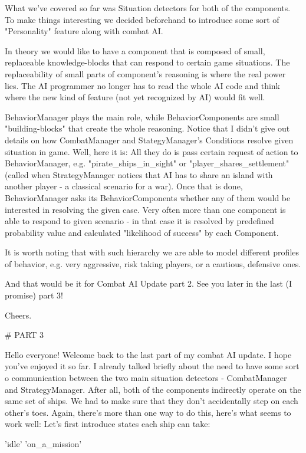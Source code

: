 What we've covered so far was Situation detectors for both of the components. 
To make things interesting we decided beforehand to introduce some sort of "Personality" feature along with combat AI.

In theory we would like to have a component that is composed of small, replaceable knowledge-blocks that can respond to certain game situations. 
The replaceability of small parts of component's reasoning is where the real power lies. 
The AI programmer no longer has to read the whole AI code and think where the new kind of feature (not yet recognized by AI) would fit well.

BehaviorManager plays the main role, while BehaviorComponents are small "building-blocks" that create the whole reasoning. 
Notice that I didn't give out details on how CombatManager and StategyManager's Conditions resolve given situation in game. 
Well, here it is: All they do is pass certain request of action to BehaviorManager, e.g. "pirate_ships_in_sight" or "player_shares_settlement" (called when StrategyManager notices that AI has to share an island with another player - a classical scenario for a war). 
Once that is done, BehaviorManager asks its BehaviorComponents whether any of them would be interested in resolving the given case. 
Very often more than one component is able to respond to given scenario - in that case it is resolved by predefined probability value and calculated "likelihood of success" by each Component.

It is worth noting that with such hierarchy we are able to model different profiles of behavior, e.g. very aggressive, risk taking players, or a cautious, defensive ones.

And that would be it for Combat AI Update part 2. 
See you later in the last (I promise) part 3!

Cheers.

# PART 3 

Hello everyone!
Welcome back to the last part of my combat AI update. I hope you've enjoyed it so far.
I already talked briefly about the need to have some sort o communication between the two main situation detectors - CombatManager and StrategyManager. 
After all, both of the components indirectly operate on the same set of ships. 
We had to make sure that they don't accidentally step on each other's toes. 
Again, there's more than one way to do this, here's what seems to work well:
Let's first introduce states each ship can take:

    'idle'
    'on_a_mission'

